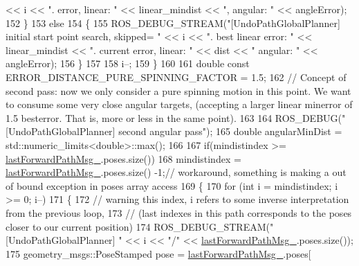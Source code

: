 \begin{DoxyCode}
       << i << \textcolor{stringliteral}{". error, linear: "} << linear\_mindist << \textcolor{stringliteral}{", angular: "} << angleError);
152                 \}
153                 \textcolor{keywordflow}{else}
154                 \{
155                     ROS\_DEBUG\_STREAM(\textcolor{stringliteral}{"[UndoPathGlobalPlanner] initial start point search, skipped= "} << i 
      << \textcolor{stringliteral}{". best linear error: "} << linear\_mindist << \textcolor{stringliteral}{". current error, linear: "} << dist << \textcolor{stringliteral}{" angular: "} << 
      angleError);
156                 \}
157 
158                 i--;
159             \}
160 
161             \textcolor{keywordtype}{double} \textcolor{keyword}{const} ERROR\_DISTANCE\_PURE\_SPINNING\_FACTOR = 1.5;
162             \textcolor{comment}{// Concept of second pass: now we only consider a pure spinning motion in this point. We want
       to consume some very close angular targets, (accepting a larger linear minerror of 1.5 besterror. That is,
       more or less in the same point).}
163 
164             ROS\_DEBUG(\textcolor{stringliteral}{"[UndoPathGlobalPlanner] second angular pass"});
165             \textcolor{keywordtype}{double} angularMinDist = std::numeric\_limits<double>::max();
166             
167                 \textcolor{keywordflow}{if}(mindistindex >=  \hyperlink{classcl__move__base__z_1_1undo__path__global__planner_1_1UndoPathGlobalPlanner_a9a4a6e40f5b6cb5f77dedbc5b6170871}{lastForwardPathMsg\_}.poses.size())
168                     mindistindex = \hyperlink{classcl__move__base__z_1_1undo__path__global__planner_1_1UndoPathGlobalPlanner_a9a4a6e40f5b6cb5f77dedbc5b6170871}{lastForwardPathMsg\_}.poses.size() -1;\textcolor{comment}{// workaround,
       something is making a out of bound exception in poses array access}
169             \{
170                 \textcolor{keywordflow}{for} (\textcolor{keywordtype}{int} i = mindistindex; i >= 0; i--)
171                 \{
172                     \textcolor{comment}{// warning this index, i refers to some inverse interpretation from the previous loop,}
173                     \textcolor{comment}{// (last indexes in this path corresponds to the poses closer to our current position)}
174                     ROS\_DEBUG\_STREAM(\textcolor{stringliteral}{"[UndoPathGlobalPlanner] "} << i << \textcolor{stringliteral}{"/"} << 
      \hyperlink{classcl__move__base__z_1_1undo__path__global__planner_1_1UndoPathGlobalPlanner_a9a4a6e40f5b6cb5f77dedbc5b6170871}{lastForwardPathMsg\_}.poses.size());
175                     geometry\_msgs::PoseStamped pose = \hyperlink{classcl__move__base__z_1_1undo__path__global__planner_1_1UndoPathGlobalPlanner_a9a4a6e40f5b6cb5f77dedbc5b6170871}{lastForwardPathMsg\_}.poses[

\end{DoxyCode}
